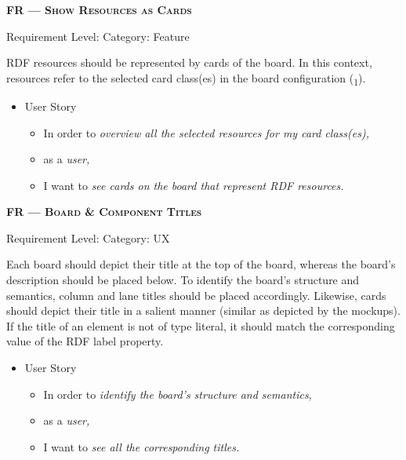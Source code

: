 \centerline{\textbf{FR\textsubscript{} --- \textsc{Show Resources as Cards}}}

\centerline{\small Requirement Level:  \quad{} Category: Feature}

\noindent \acrshort*{RDF} resources should be represented by cards of the board. In this context, resources refer to the selected card class(es) in the board configuration (\textsubscript{1}).

\begin{itemize}[after=\vspace{1em}]
    \setlength\itemsep{-0.5em}
	\item[] User Story\\[-7.8mm]
	\begin{itemize}
    \setlength\itemsep{-0.5em}
        \item[] In order to \textit{overview all the selected resources for my card class(es),}
        \item[] as a \textit{user,}
        \item[] I want to \textit{see cards on the board that represent \acrshort*{RDF} resources.}
    \end{itemize}
\end{itemize}








\centerline{\textbf{FR\textsubscript{} --- \textsc{Board \& Component Titles}}}

\centerline{\small Requirement Level:  \quad{} Category: \acrshort*{UX}}

\noindent Each board should depict their title at the top of the board, whereas the board’s description should be placed below. To identify the board’s structure and semantics, column and lane titles should be placed accordingly. Likewise, cards should depict their title in a salient manner (similar as depicted by the mockups). If the title of an element is not of type literal, it should match the corresponding value of the \acrshort*{RDF} label property.


\begin{itemize}[after=\vspace{1em}]
    \setlength\itemsep{-0.5em}
	\item[] User Story\\[-7.8mm]
	\begin{itemize}
    \setlength\itemsep{-0.5em}
        \item[] In order to \textit{identify the board’s structure and semantics,}
        \item[] as a \textit{user,}
        \item[] I want to \textit{see all the corresponding titles.}
    \end{itemize}
\end{itemize}




